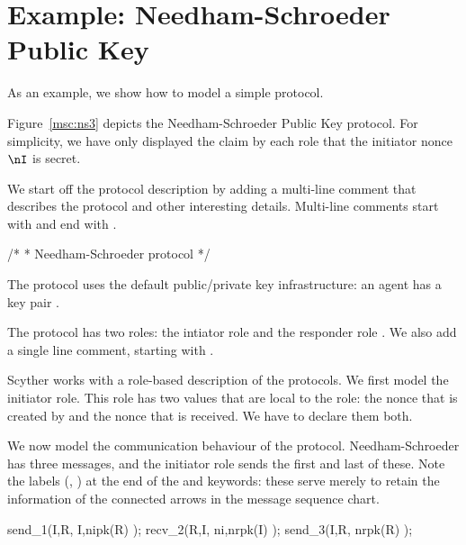 \documentclass{book}
\begin{document}
\section{Example: Needham-Schroeder Public Key}

As an example, we show how to model a simple protocol.

Figure~\ref{msc:ns3} depicts the Needham-Schroeder Public Key protocol.
For simplicity, we have only displayed the claim by each role
that the initiator nonce $\nI$ is secret.

We start off the protocol description by adding a multi-line
comment that describes the protocol and other interesting details.
Multi-line comments start with \spd{/*} and end with \spd{*/}.
\begin{spdl}[numbers=left]
/* 
 * Needham-Schroeder protocol
 */
\end{spdl}

The protocol uses the default public/private key infrastructure: an agent
 has
a key pair . 

The protocol has two roles: the
intiator role  and the responder role . We also add a
single line comment, starting with \spd{//}.
\begin{spdl}[numbers=left,firstnumber=5]
// The protocol description

protocol ns3(I,R)
{
\end{spdl}

Scyther works with a role-based description of the protocols. We first
model the initiator role. This role has two values that are local to the
role: the nonce that is created by  and the nonce that is
received. We have to declare them both.
\begin{spdl}[numbers=left,firstnumber=9]
  role I
  {
    fresh ni: Nonce;
    var nr: Nonce;
\end{spdl}

We now model the communication behaviour of the protocol.
Needham-Schroeder has three messages, and the initiator role sends the
first and last of these. Note the labels (\eg, ) at the end of
the  and  keywords: these serve merely to retain the
information of the connected arrows in the message sequence chart.

\begin{spdl}[numbers=left,firstnumber=14]
    send_1(I,R, {I,ni}pk(R) );
    recv_2(R,I, {ni,nr}pk(I) );
    send_3(I,R, {nr}pk(R) );
\end{spdl}
\end{document}
